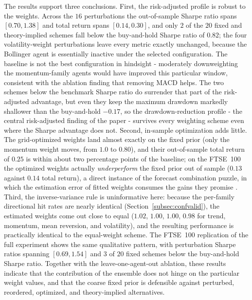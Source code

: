 \documentclass{ieeeaccess}
\newcommand{\BHsharpe}{\ensuremath{0.82}}
\newcommand{\MDDbh}{\ensuremath{-0.17}}
\newcommand{\FtseTRtest}{\ensuremath{0.14}}
\newcommand{\WSPerturbN}{\ensuremath{16}}
\newcommand{\WSPerturbTRMin}{\ensuremath{0.14}}
\newcommand{\WSPerturbTRMax}{\ensuremath{0.30}}
\newcommand{\WSPerturbSharpeMin}{\ensuremath{0.70}}
\newcommand{\WSPerturbSharpeMax}{\ensuremath{1.38}}
\newcommand{\WSFixedBelowBH}{\ensuremath{2}}
\newcommand{\WSFixedN}{\ensuremath{20}}
\newcommand{\WSOptTR}{\ensuremath{0.25}}
\newcommand{\WSOptWmom}{\ensuremath{0.80}}
\newcommand{\WSIvWtrend}{\ensuremath{1.02}}
\newcommand{\WSIvWmom}{\ensuremath{1.00}}
\newcommand{\WSIvWmr}{\ensuremath{1.00}}
\newcommand{\WSIvWvol}{\ensuremath{0.98}}
\newcommand{\FtseWSPerturbSharpeMin}{\ensuremath{0.69}}
\newcommand{\FtseWSPerturbSharpeMax}{\ensuremath{1.54}}
\newcommand{\FtseWSFixedBelowBH}{\ensuremath{3}}
\newcommand{\FtseWSFixedN}{\ensuremath{20}}
\newcommand{\FtseWSOptTR}{\ensuremath{0.13}}
\begin{document}
The results support three conclusions. First, the risk-adjusted profile is robust to the weights. Across the \WSPerturbN{} perturbations the out-of-sample Sharpe ratio spans $[\WSPerturbSharpeMin{}, \WSPerturbSharpeMax{}]$ and total return spans $[\WSPerturbTRMin{}, \WSPerturbTRMax{}]$, and only \WSFixedBelowBH{} of the \WSFixedN{} fixed and theory-implied schemes fall below the buy-and-hold Sharpe ratio of \BHsharpe{}; the four volatility-weight perturbations leave every metric exactly unchanged, because the Bollinger agent is essentially inactive under the selected configuration. The baseline is not the best configuration in hindsight - moderately downweighting the momentum-family agents would have improved this particular window, consistent with the ablation finding that removing MACD helps. The two schemes below the benchmark Sharpe ratio do surrender that part of the risk-adjusted advantage, but even they keep the maximum drawdown markedly shallower than the buy-and-hold \MDDbh{}, so the drawdown-reduction profile - the central risk-adjusted finding of the paper - survives every weighting scheme even where the Sharpe advantage does not. Second, in-sample optimization adds little. The grid-optimized weights land almost exactly on the fixed prior (only the momentum weight moves, from $1.0$ to $\WSOptWmom{}$), and their out-of-sample total return of \WSOptTR{} is within about two percentage points of the baseline; on the FTSE~100 the optimized weights actually \emph{underperform} the fixed prior out of sample (\FtseWSOptTR{} against \FtseTRtest{} total return), a direct instance of the forecast combination puzzle, in which the estimation error of fitted weights consumes the gains they promise \cite{smithwallis2009,claeskens2016}. Third, the inverse-variance rule is uninformative here: because the per-family directional hit rates are nearly identical (Section~\ref{subsec:confvalid}), the estimated weights come out close to equal ($\WSIvWtrend{}$, $\WSIvWmom{}$, $\WSIvWmr{}$, $\WSIvWvol{}$ for trend, momentum, mean reversion, and volatility), and the resulting performance is practically identical to the equal-weight scheme. The FTSE~100 replication of the full experiment shows the same qualitative pattern, with perturbation Sharpe ratios spanning $[\FtseWSPerturbSharpeMin{}, \FtseWSPerturbSharpeMax{}]$ and \FtseWSFixedBelowBH{} of \FtseWSFixedN{} fixed schemes below the buy-and-hold Sharpe ratio. Together with the leave-one-agent-out ablation, these results indicate that the contribution of the ensemble does not hinge on the particular weight values, and that the coarse fixed prior is defensible against perturbed, reordered, optimized, and theory-implied alternatives.
\end{document}
